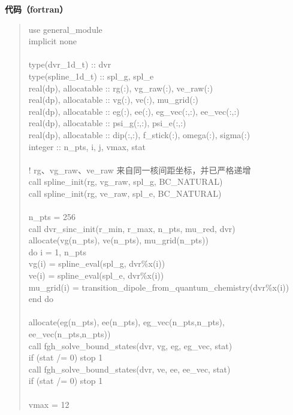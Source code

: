 \documentclass[UTF8,openany,11pt,fontset=fandol]{ctexbook}
\begin{document}
\textbf{代码（fortran）}

\begin{quote}
use general\_module\\
implicit none\\
~\\
type(dvr\_1d\_t) :: dvr\\
type(spline\_1d\_t) :: spl\_g, spl\_e\\
real(dp), allocatable :: rg(:), vg\_raw(:), ve\_raw(:)\\
real(dp), allocatable :: vg(:), ve(:), mu\_grid(:)\\
real(dp), allocatable :: eg(:), ee(:), eg\_vec(:,:), ee\_vec(:,:)\\
real(dp), allocatable :: psi\_g(:,:), psi\_e(:,:)\\
real(dp), allocatable :: dip(:,:), f\_stick(:), omega(:), sigma(:)\\
integer :: n\_pts, i, j, vmax, stat\\
~\\
! rg、vg\_raw、ve\_raw 来自同一核间距坐标，并已严格递增\\
call spline\_init(rg, vg\_raw, spl\_g, BC\_NATURAL)\\
call spline\_init(rg, ve\_raw, spl\_e, BC\_NATURAL)\\
~\\
n\_pts = 256\\
call dvr\_sinc\_init(r\_min, r\_max, n\_pts, mu\_red, dvr)\\
allocate(vg(n\_pts), ve(n\_pts), mu\_grid(n\_pts))\\
do i = 1, n\_pts\\
vg(i) = spline\_eval(spl\_g, dvr\%x(i))\\
ve(i) = spline\_eval(spl\_e, dvr\%x(i))\\
mu\_grid(i) = transition\_dipole\_from\_quantum\_chemistry(dvr\%x(i))\\
end do\\
~\\
allocate(eg(n\_pts), ee(n\_pts), eg\_vec(n\_pts,n\_pts),
ee\_vec(n\_pts,n\_pts))\\
call fgh\_solve\_bound\_states(dvr, vg, eg, eg\_vec, stat)\\
if (stat /= 0) stop 1\\
call fgh\_solve\_bound\_states(dvr, ve, ee, ee\_vec, stat)\\
if (stat /= 0) stop 1\\
~\\
vmax = 12\\

\end{quote}
\end{document}
